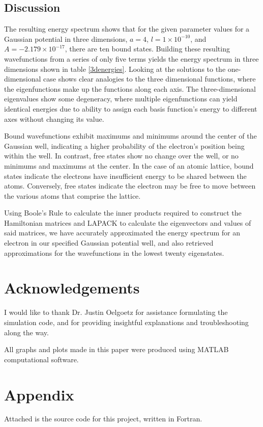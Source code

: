 \documentclass[12pt]{article}
\begin{document}
\subsection*{Discussion}
The resulting energy spectrum shows that for the given parameter values for a Gaussian potential in three dimensions, $a = 4$, $l = 1\times 10^{-10}$, and $A = -2.179\times 10^{-17}$, there are ten bound states.  Building these resulting wavefunctions from a series of only five terms yields the energy spectrum in three dimensions shown in table \ref{3denergies}.  Looking at the solutions to the one-dimensional case shows clear analogies to the three dimensional functions, where the eigenfunctions make up the functions along each axis.  The three-dimensional eigenvalues show some degeneracy, where multiple eigenfunctions can yield identical energies due to ability to assign each basis function's energy to different axes without changing its value.

Bound wavefunctions exhibit maximums and minimums around the center of the Gaussian well, indicating a higher probability of the electron's position being within the well.  In contrast, free states show no change over the well, or no minimums and maximums at the center.  In the case of an atomic lattice, bound states indicate the electrons have insufficient energy to be shared between the atoms.  Conversely, free states indicate the electron may be free to move between the various atoms that comprise the lattice.

Using Boole's Rule to calculate the inner products required to construct the Hamiltonian matrices and LAPACK to calculate the eigenvectors and values of said matrices, we have accurately approximated the energy spectrum for an electron in our specified Gaussian potential well, and also retrieved approximations for the wavefunctions in the lowest twenty eigenstates.
\pagebreak
\section*{Acknowledgements}
I would like to thank Dr. Justin Oelgoetz for assistance formulating the simulation code, and for providing insightful explanations and troubleshooting along the way.

All graphs and plots made in this paper were produced using MATLAB computational software.
\newpage


\newpage
\section*{Appendix}
Attached is the source code for this project, written in Fortran.
\end{document}

